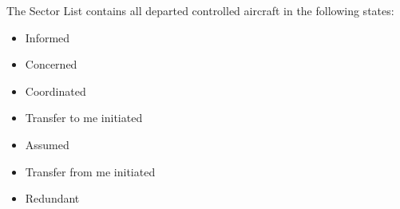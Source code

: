 \documentclass[a4paper,oneside,11pt]{memoir}
\begin{document}
The Sector List contains all departed controlled aircraft in the following states:

\bigskip

\begin{itemize}
    \item Informed\footnotemark[1]
    \item Concerned\footnotemark[1]\footnotemark[2]
    \item Coordinated
    \item Transfer to me initiated
    \item Assumed
    \item Transfer from me initiated
    \item Redundant\footnotemark[1]
\end{itemize}


\end{document}
